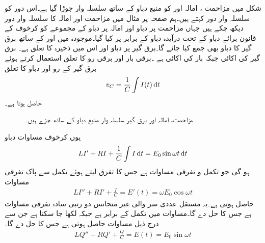شکل  میں  مزاحمت ، امالہ  اور    کو منبع دباو کے ساتھ سلسلہ وار جوڑا گیا ہے۔اس دور کو سلسلہ وار  دور کہتے ہیں۔ہم صفحہ  پر مثال  میں مزاحمت اور امالہ کا سلسلہ وار  دور دیکھ چکے ہیں جہاں مزاحمت پر دباو  اور امالہ پر دباو  کے مجموعے کو کرخوف کے قانون برائے دباو کے تحت درآیدہ دباو  کے برابر پر کیا گیا۔موجودہ  میں  اور  کے ساتھ برق گیر کا دباو  بھی جمع کیا جائے گا۔برق گیر پر دباو  اور اس میں ذخیرہ   کا تعلق  ہے۔ برق گیر کی اکائی   جبکہ بار کی اکائی   ہے ۔برقی بار اور برقی رو کا تعلق  استعمال کرتے ہوئے برق گیر کے رو اور دباو کا تعلق 
\begin{align}
v_C=\frac{1}{C}\int I(t) \dif t
\end{align}
حاصل ہوتا ہے۔
\begin{figure}
\centering
{}
\caption{مزاحمت، امالہ اور برق گیر سلسلہ وار منبع دباو کے ساتھ جڑے ہیں۔}
\label{شکل_سادہ_دو_سلسلہ_وار_دور_الف}
\end{figure}

یوں کرخوف مساوات دباو
\begin{align}\label{مساوات_سادہ_دو_سلسلہ_وار_الف}
LI'+RI+\frac{1}{C}\int I\dif t=E_0\sin \omega t\dif t
\end{align}
ہو گی جو تکمل و تفرقی مساوات ہے جس کا تفرق لیتے ہوئے تکمل سے پاک تفرقی مساوات
\begin{align}\label{مساوات_سادہ_دو_سلسلہ_وار_ب}
LI''+RI'+\frac{I}{C}=E'(t)=\omega E_0\cos \omega t
\end{align}
 حاصل ہوتی ہے۔یہ مستقل عددی سر والی غیر متجانس دو رتبی سادہ تفرقی مساوات ہے جس کا حل  دے گا۔مساوات  میں تکمل  کے برابر ہے جبکہ   لکھا جا سکتا ہے جن سے درج ذیل مساوات حاصل ہوتی ہے جس کا حل  دے گا۔
\begin{align}\label{مساوات_سادہ_دو_سلسلہ_وار_پ}
LQ''+RQ'+\frac{Q}{C}=E(t)=E_0\sin \omega t
\end{align}

